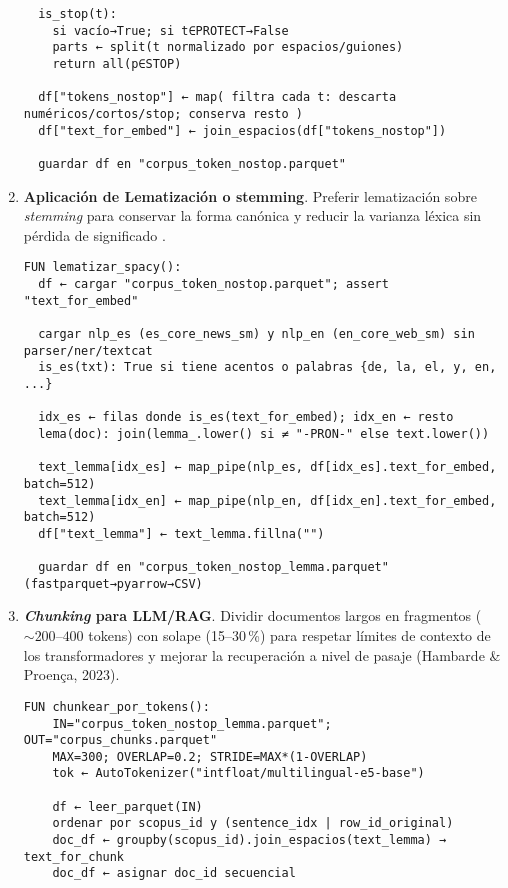 \begin{enumerate}
\begin{verbatim}
  is_stop(t):
    si vacío→True; si t∈PROTECT→False
    parts ← split(t normalizado por espacios/guiones)
    return all(p∈STOP)  

  df["tokens_nostop"] ← map( filtra cada t: descarta numéricos/cortos/stop; conserva resto )
  df["text_for_embed"] ← join_espacios(df["tokens_nostop"])

  guardar df en "corpus_token_nostop.parquet"
\end{verbatim}


    \item \textbf{Aplicación de Lematización o stemming}. Preferir lematización sobre \textit{stemming} para conservar la forma canónica y reducir 
    la varianza léxica sin pérdida de significado \parencite{tabassum2020}.
\begin{verbatim}
FUN lematizar_spacy():
  df ← cargar "corpus_token_nostop.parquet"; assert "text_for_embed"

  cargar nlp_es (es_core_news_sm) y nlp_en (en_core_web_sm) sin parser/ner/textcat
  is_es(txt): True si tiene acentos o palabras {de, la, el, y, en, ...}

  idx_es ← filas donde is_es(text_for_embed); idx_en ← resto
  lema(doc): join(lemma_.lower() si ≠ "-PRON-" else text.lower())

  text_lemma[idx_es] ← map_pipe(nlp_es, df[idx_es].text_for_embed, batch=512)
  text_lemma[idx_en] ← map_pipe(nlp_en, df[idx_en].text_for_embed, batch=512)
  df["text_lemma"] ← text_lemma.fillna("")

  guardar df en "corpus_token_nostop_lemma.parquet" (fastparquet→pyarrow→CSV)
\end{verbatim}

    \item \textbf{\textit{Chunking} para LLM/RAG}. Dividir documentos largos en fragmentos (\(\sim 200\text{--}400\) tokens) con solape (15–30\,\%) para respetar 
    límites de contexto de los transformadores y mejorar la recuperación a nivel de pasaje (Hambarde \& Proença, 2023).
    \begin{verbatim}
FUN chunkear_por_tokens():
    IN="corpus_token_nostop_lemma.parquet"; OUT="corpus_chunks.parquet"
    MAX=300; OVERLAP=0.2; STRIDE=MAX*(1-OVERLAP)
    tok ← AutoTokenizer("intfloat/multilingual-e5-base")

    df ← leer_parquet(IN)
    ordenar por scopus_id y (sentence_idx | row_id_original)
    doc_df ← groupby(scopus_id).join_espacios(text_lemma) → text_for_chunk
    doc_df ← asignar doc_id secuencial


\end{verbatim}
\end{enumerate}
